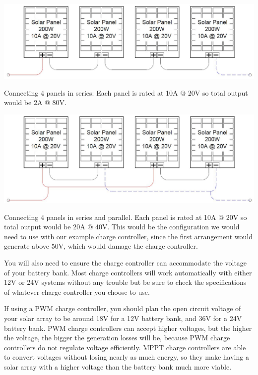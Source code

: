 \documentclass{article}
\theoremstyle{definition}
\theoremstyle{definition}
\theoremstyle{remark}
\begin{document}
  \begin{center}
    \includegraphics[width=0.75\paperwidth]{Images/image_13_2_(whole_system_2).png}
  \end{center}
  
  Connecting 4 panels in series: Each panel is rated at 10A @ 20V so total output would be 2A @ 80V.

  \begin{center}
    \includegraphics[width=0.75\paperwidth]{Images/image_13_3_(whole_system_3).png}
  \end{center}

  Connecting 4 panels in series and parallel. Each panel is rated at 10A @ 20V so total output would be 20A @ 40V. This would be the configuration we would need to use with our example charge controller, since the first arrangement would generate above 50V, which would damage the charge controller.

  You will also need to ensure the charge controller can accommodate the voltage of your battery bank. Most charge controllers will work automatically with either 12V or 24V systems without any trouble but be sure to check the specifications of whatever charge controller you choose to use.

  If using a PWM charge controller, you should plan the open circuit voltage of your solar array to be around 18V for a 12V battery bank, and 36V for a 24V battery bank. PWM charge controllers can accept higher voltages, but the higher the voltage, the bigger the generation losses will be, because PWM charge controllers do not regulate voltage efficiently. MPPT charge controllers are able to convert voltages without losing nearly as much energy, so they make having a solar array with a higher voltage than the battery bank much more viable.
\end{document}
